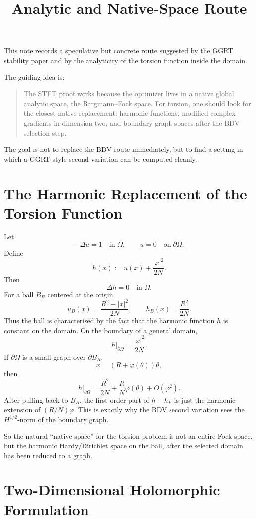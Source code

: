 \documentclass[11pt]{article}
\title{Analytic and Native-Space Route}
\author{}
\date{}
\begin{document}
\maketitle

This note records a speculative but concrete route suggested by the GGRT
stability paper and by the analyticity of the torsion function inside the
domain.

The guiding idea is:

\begin{quote}
The STFT proof works because the optimizer lives in a native global analytic
space, the Bargmann--Fock space. For torsion, one should look for the closest
native replacement: harmonic functions, modified complex gradients in dimension
two, and boundary graph spaces after the BDV selection step.
\end{quote}

The goal is not to replace the BDV route immediately, but to find a setting in
which a GGRT-style second variation can be computed cleanly.

\section{The Harmonic Replacement of the Torsion Function}

Let
\[
-\Delta u=1\quad\text{in }\Omega,\qquad u=0\quad\text{on }\partial\Omega.
\]
Define
\[
h(x):=u(x)+\frac{|x|^2}{2N}.
\]
Then
\[
\Delta h=0\quad\text{in }\Omega.
\]
For a ball \(B_R\) centered at the origin,
\[
u_B(x)=\frac{R^2-|x|^2}{2N},
\qquad
h_B(x)=\frac{R^2}{2N}.
\]
Thus the ball is characterized by the fact that the harmonic function \(h\) is
constant on the domain. On the boundary of a general domain,
\[
h|_{\partial\Omega}=\frac{|x|^2}{2N}.
\]
If \(\partial\Omega\) is a small graph over \(\partial B_R\),
\[
x=(R+\varphi(\theta))\theta,
\]
then
\[
h|_{\partial\Omega}
=
\frac{R^2}{2N}
+
\frac{R}{N}\varphi(\theta)
+
O(\varphi^2).
\]
After pulling back to \(B_R\), the first-order part of \(h-h_B\) is just the
harmonic extension of \((R/N)\varphi\). This is exactly why the BDV second
variation sees the \(H^{1/2}\)-norm of the boundary graph.

So the natural ``native space'' for the torsion problem is not an entire Fock
space, but the harmonic Hardy/Dirichlet space on the ball, after the selected
domain has been reduced to a graph.

\section{Two-Dimensional Holomorphic Formulation}
\end{document}
